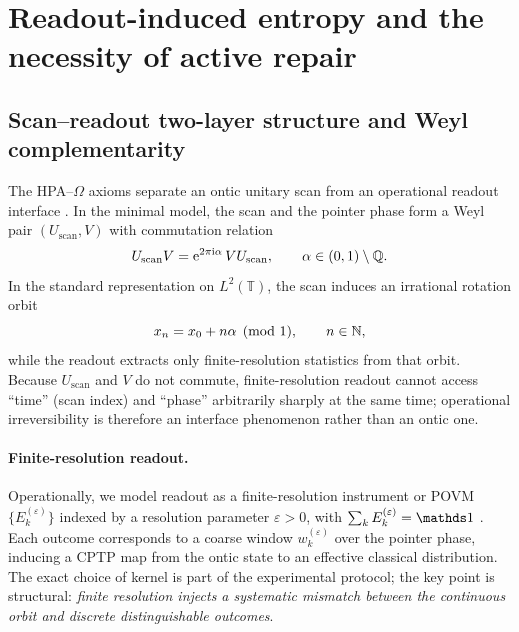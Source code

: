 \section{Readout-induced entropy and the necessity of active repair}
\label{sec:readout_phase_friction}

\subsection{Scan--readout two-layer structure and Weyl complementarity}
\label{sec:weyl_complementarity}

The HPA--$\Omega$ axioms separate an ontic unitary scan from an operational readout interface \cite{Ma2025HPA,Ma2025FoP,Ma2025HPOT}.
In the minimal model, the scan and the pointer phase form a Weyl pair $(U_{\mathrm{scan}},V)$ with commutation relation
\begin{equation}
  U_{\mathrm{scan}} V = \mathrm{e}^{2\pi \mathrm{i} \alpha}\, V U_{\mathrm{scan}},
  \qquad \alpha\in(0,1)\setminus \mathbb{Q}.
  \label{eq:weyl_pair}
\end{equation}
In the standard representation on $L^2(\mathbb{T})$, the scan induces an irrational rotation orbit \cite{Folland1989}
\begin{equation}
  x_n = x_0 + n\alpha \pmod 1,
  \qquad n\in\mathbb{N},
  \label{eq:kronecker_orbit}
\end{equation}
while the readout extracts only finite-resolution statistics from that orbit.
Because $U_{\mathrm{scan}}$ and $V$ do not commute, finite-resolution readout cannot access ``time'' (scan index) and ``phase'' arbitrarily sharply at the same time; operational irreversibility is therefore an interface phenomenon rather than an ontic one.

\paragraph{Finite-resolution readout.}
Operationally, we model readout as a finite-resolution instrument or POVM $\{E_k^{(\varepsilon)}\}$ indexed by a resolution parameter $\varepsilon>0$, with $\sum_k E_k^{(\varepsilon)}=\ind$ \cite{NielsenChuang2010}.
Each outcome corresponds to a coarse window $w_k^{(\varepsilon)}$ over the pointer phase, inducing a CPTP map from the ontic state to an effective classical distribution.
The exact choice of kernel is part of the experimental protocol; the key point is structural: \emph{finite resolution injects a systematic mismatch between the continuous orbit and discrete distinguishable outcomes}.

